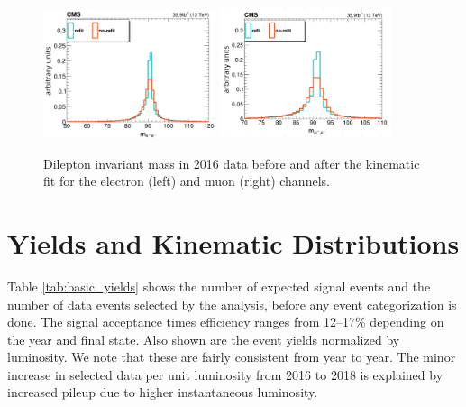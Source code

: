 \begin{figure}[tb]
	\begin{center}
		\includegraphics[width=0.45\textwidth]{fig/selection/kinfit_data_el.png}
		\includegraphics[width=0.45\textwidth]{fig/selection/kinfit_data_mu.png}
	\end{center}
	\caption{Dilepton invariant mass in 2016 data before and after the kinematic fit for the electron (left) and muon (right) channels.}
	\label{fig:kinfit}
\end{figure}

\section{Yields and Kinematic Distributions}
Table \ref{tab:basic_yields} shows the number of expected \hzg{} signal events and the number of data events selected by the analysis, before any event categorization is done. The signal acceptance times efficiency ranges from 12--17\% depending on the year and final state. Also shown are the event yields normalized by luminosity. We note that these are fairly consistent from year to year. The minor increase in selected data per unit luminosity from 2016 to 2018 is explained by increased pileup due to higher instantaneous luminosity.

